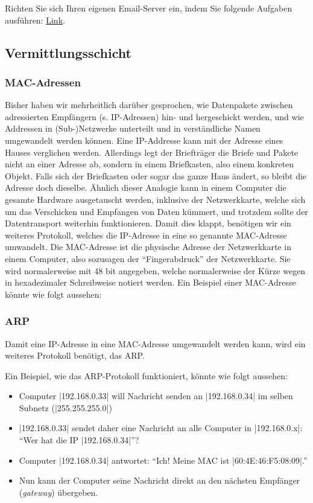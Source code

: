 \begin{mychallenge}
Richten Sie sich Ihren eigenen Email-Server ein, indem Sie folgende Aufgaben ausführen: \href{https://inf-schule.de/rechnernetze/filius/internet/exkurs_email}{Link}.
\end{mychallenge}

\subsection{Vermittlungsschicht}
\subsubsection{MAC-Adressen}
Bisher haben wir mehrheitlich darüber gesprochen, wie Datenpakete zwischen adressierten Empfängern (s. \gls{IP}-Adressen) hin- und hergeschickt werden, und wie Addressen in (Sub-)Netzwerke unterteilt und in verständliche Namen umgewandelt werden können. Eine \gls{IP}-Addresse kann mit der Adresse eines Hauses verglichen werden. Allerdings legt der Briefträger die Briefe und Pakete nicht an einer Adresse ab, sondern in einem Briefkasten, also einem konkreten Objekt. Falls sich der Briefkasten oder sogar das ganze Haus ändert, so bleibt die Adresse doch dieselbe. Ähnlich dieser Analogie kann in einem Computer die gesamte Hardware ausgetauscht werden, inklusive der Netzwerkkarte, welche sich um das Verschicken und Empfangen von Daten kümmert, und trotzdem sollte der Datentransport weiterhin funktionieren. Damit dies klappt, benötigen wir ein weiteres Protokoll, welches die \gls{IP}-Adresse in eine so genannte \gls{MAC}-Adresse umwandelt. Die \gls{MAC}-Adresse ist die physische Adresse der Netzwerkkarte in einem Computer, also sozusagen der ``Fingerabdruck'' der Netzwerkkarte. Sie wird normalerweise mit 48 bit angegeben, welche normalerweise der Kürze wegen in hexadezimaler Schreibweise notiert werden. Ein Beispiel einer \gls{MAC}-Adresse könnte wie folgt aussehen: 

\subsubsection{ARP}
Damit eine \gls{IP}-Adresse in eine \gls{MAC}-Adresse umgewandelt werden kann, wird ein weiteres Protokoll benötigt, das \gls{ARP}.

Ein Beispiel, wie das \gls{ARP}-Protokoll funktioniert, könnte wie folgt aussehen:
\begin{itemize}
\item Computer \commandbox|192.168.0.33| will Nachricht senden an \commandbox|192.168.0.34| im selben Subnetz (\commandBluebox|255.255.255.0|)
\item \commandbox|192.168.0.33| sendet daher eine Nachricht an alle Computer in \commandbox|192.168.0.x|: ``Wer hat die IP \commandbox|192.168.0.34|''?
\item Computer \commandbox|192.168.0.34| antwortet: ``Ich! Meine MAC ist \commandbox|60:4E:46:F5:08:09|.''
\item Nun kann der Computer seine Nachricht direkt an den nächsten Empfänger (\textit{gateway}) übergeben.
\end{itemize}


